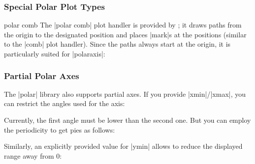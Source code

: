 {\subsubsection{Special Polar Plot Types}
\begin{plottype}{polar comb}
	The |polar comb| plot handler is provided by \Tikz; it draws paths from the origin to the designated position and places |mark|s at the positions (similar to the |comb| plot handler). Since the paths always start at the origin, it is particularly suited for |polaraxis|:
\begin{codeexample}[]
\end{codeexample}
\end{plottype}

\subsubsection{Partial Polar Axes}
The |polar| library also supports partial axes. If you provide |xmin|/|xmax|, you can restrict the angles used for the axis:
\begin{codeexample}[]
\end{codeexample}

Currently, the first angle must be lower than the second one. But you can employ the periodicity to get pies as follows:
\begin{codeexample}[]
\end{codeexample}
\noindent Similarly, an explicitly provided value for |ymin| allows to reduce the displayed range away from $0$:
\begin{codeexample}[]
\end{codeexample}

}
